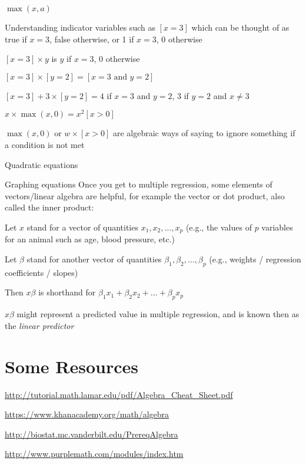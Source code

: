   $\max(x, a)$
\item Understanding indicator variables such as $[x=3]$ which can be
  thought of as true if $x=3$, false otherwise, or 1 if $x=3$, 0
  otherwise
 \bi
 \item $[x=3]\times y$ is $y$ if $x=3$, 0 otherwise
 \item $[x=3]\times[y=2] = [x=3 \textrm{~and~} y=2]$
 \item $[x=3] + 3\times [y=2] = 4$ if $x=3$ and $y=2$, $3$ if $y=2$
   and $x\neq 3$
 \item $x\times \max(x, 0) = x^{2}[x>0]$
 \item $\max(x, 0)$ or $w \times [x>0]$ are algebraic ways of saying
   to ignore something if a condition is not met
 \ei
\item Quadratic equations
\item Graphing equations
\ei
Once you get to multiple regression, some elements of vectors/linear
algebra are helpful, for example the vector or dot product, also
called the inner product:
\bi
\item Let $x$ stand for a vector of quantities $x_{1}, x_{2}, \ldots,
  x_{p}$ (e.g., the values of $p$ variables for an animal such as age,
  blood pressure, etc.)
\item Let $\beta$ stand for another vector of quantities $\beta_{1},
  \beta_{2}, \ldots, \beta_{p}$ (e.g., weights / regression
  coefficients / slopes)
\item Then $x\beta$ is shorthand for $\beta_{1}x_{1}+\beta_{2}x_{2} +
  \ldots + \beta_{p}x_{p}$
\item $x\beta$ might represent a predicted value in multiple
  regression, and is known then as the \emph{linear predictor}
\ei

\section{Some Resources}
\bi
\item \url{http://tutorial.math.lamar.edu/pdf/Algebra_Cheat_Sheet.pdf}
\item \url{https://www.khanacademy.org/math/algebra}
\item \url{http://biostat.mc.vanderbilt.edu/PrereqAlgebra}
\item \url{http://www.purplemath.com/modules/index.htm}
\ei
